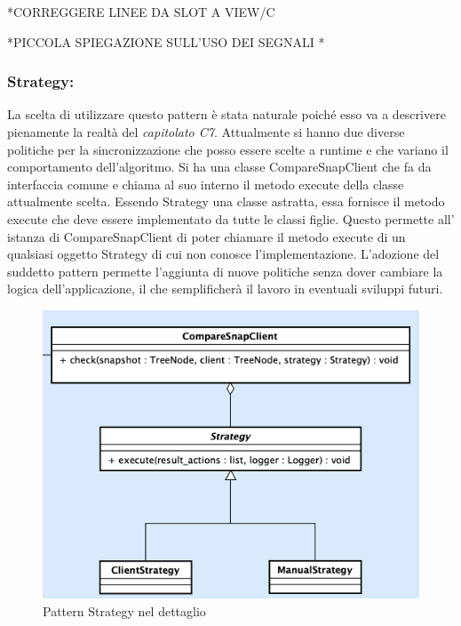 *CORREGGERE LINEE DA SLOT A VIEW/C

*PICCOLA SPIEGAZIONE SULL'USO DEI SEGNALI *

\subsubsection{Strategy:}
La scelta di utilizzare questo pattern è stata naturale poiché esso va a descrivere pienamente la realtà del \textit{capitolato C7}.\newline{}
Attualmente si hanno due diverse politiche per la sincronizzazione che posso essere scelte a runtime e che variano il comportamento dell'algoritmo. Si ha una classe CompareSnapClient che fa da interfaccia comune e chiama al suo interno il metodo execute della classe attualmente scelta. Essendo Strategy una classe astratta, essa fornisce il metodo execute che deve essere implementato da tutte le classi figlie. Questo permette all' istanza di CompareSnapClient di poter chiamare il metodo execute di un qualsiasi oggetto Strategy di cui non conosce l'implementazione. L'adozione del suddetto pattern permette l'aggiunta di nuove politiche senza dover cambiare la logica dell'applicazione, il che semplificherà il lavoro in eventuali sviluppi futuri.

\begin{figure}[H]
    \centering
    \includegraphics[scale = 0.45]{components/img/strategy-model.png}
    \caption{Pattern Strategy nel dettaglio}
    \label{fig:Pattern proxy nel dettaglio}
\end{figure}
